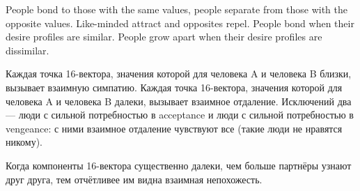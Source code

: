 \documentclass[11pt]{article}
\theoremstyle{remark}
\theoremstyle{definition}
\begin{document}
People bond to those with the same values, people separate from those with the opposite values. Like-minded attract and opposites repel. People bond when their desire profiles are similar. People grow apart when their desire profiles are dissimilar.

Каждая точка 16-вектора, значения которой для человека A и человека B близки, вызывает взаимную симпатию. Каждая точка 16-вектора, значения которой для человека A и человека B далеки, вызывает взаимное отдаление. Исключений два --- люди с сильной потребностью в acceptance и люди с сильной потребностью в vengeance: с ними взаимное отдаление чувствуют все (такие люди не нравятся никому).










Когда компоненты 16-вектора существенно далеки, чем больше партнёры узнают друг друга, тем отчётливее им видна взаимная непохожесть.
\end{document}
